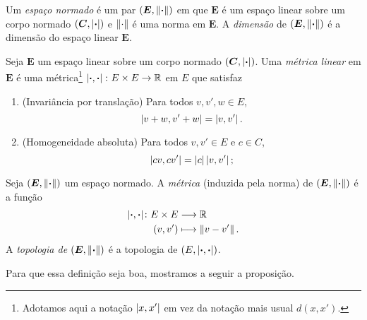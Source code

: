 \begin{definition}
Um \emph{espaço normado} é um par $(\bm E,\left\Vert{\bm{\cdot}}\right\Vert)$ em que $\bm E$ é um espaço linear sobre um corpo normado $(\bm C,\left\vert{\bm{\cdot}}\right\vert)$ e $\left\Vert{\cdot}\right\Vert$ é uma norma em $\bm E$. A \emph{dimensão} de $(\bm E,\left\Vert{\bm{\cdot}}\right\Vert)$ é a dimensão do espaço linear $\bm E$.
\end{definition}

\begin{definition}
Seja $\bm E$ um espaço linear sobre um corpo normado $(\bm C,\left\vert{\bm{\cdot}}\right\vert)$. Uma \emph{métrica linear} em $\bm E$ é uma métrica\footnote{Adotamos aqui a notação $\left\vert{x},{x'}\right\vert$ em vez da notação mais usual $d(x,x')$.} $\left\vert{\bm{\cdot}},{\bm{\cdot}}\right\vert\colon E \times E \to \mathbb{R}$ em $E$ que satisfaz
	\begin{enumerate}
	\item (Invariância por translação) Para todos $v,v',w \in E$,
		\begin{equation*}
		\left\vert{v+w},{v'+w}\right\vert = \left\vert{v},{v'}\right\vert.
		\end{equation*}
	\item (Homogeneidade absoluta) Para todos $v,v' \in E$ e $c \in C$,
		\begin{equation*}
		\left\vert{cv},{cv'}\right\vert = \left\vert{c}\right\vert\left\vert{v},{v'}\right\vert;
		\end{equation*}
	\end{enumerate}
\end{definition}

\begin{definition}
Seja $(\bm E,\left\Vert{\bm{\cdot}}\right\Vert)$ um espaço normado. A \emph{métrica} (induzida pela norma) de $(\bm E,\left\Vert{\bm{\cdot}}\right\Vert)$ é a função
	\begin{align*}
	{\left\vert{\bm{\cdot}},{\bm{\cdot}}\right\vert}\colon {E \times E} &\longrightarrow {\mathbb{R}} \\{(v,v')} &\longmapsto \left\Vert{v - v'}\right\Vert.
	\end{align*}
A \emph{topologia de $(\bm E,\left\Vert{\bm{\cdot}}\right\Vert)$} é a topologia de $(E,\left\vert{\bm{\cdot}},{\bm{\cdot}}\right\vert)$.
\end{definition}

Para que essa definição seja boa, mostramos a seguir a proposição.

